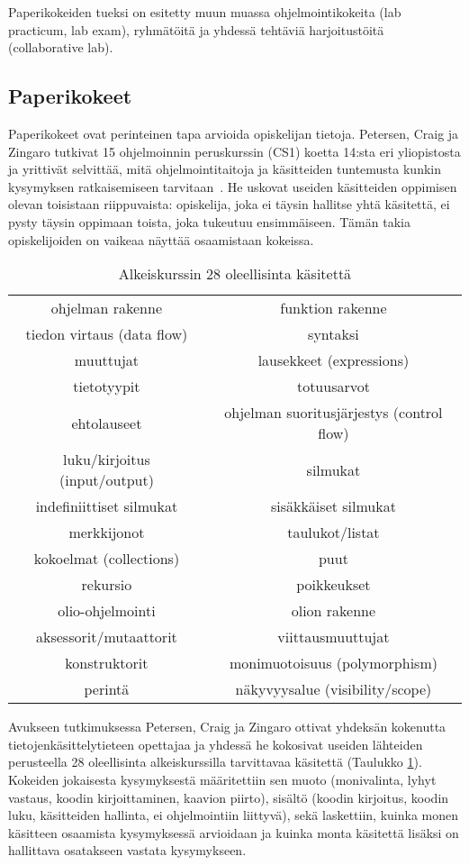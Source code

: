 \documentclass[finnish]{../tktltiki2}
\theoremstyle{definition}
\theoremstyle{remark}
\begin{document}
Paperikokeiden tueksi on esitetty muun muassa ohjelmointikokeita (lab practicum, lab exam), ryhmätöitä ja yhdessä tehtäviä harjoitustöitä (collaborative lab).

\subsection{Paperikokeet}

Paperikokeet ovat perinteinen tapa arvioida opiskelijan tietoja. Petersen, Craig ja Zingaro tutkivat 15 ohjelmoinnin peruskurssin (CS1) koetta 14:sta eri yliopistosta ja yrittivät selvittää, mitä ohjelmointitaitoja ja käsitteiden tuntemusta kunkin kysymyksen ratkaisemiseen tarvitaan~\cite{PCZ11}. He uskovat useiden käsitteiden oppimisen olevan toisistaan riippuvaista: opiskelija, joka ei täysin hallitse yhtä käsitettä, ei pysty täysin oppimaan toista, joka tukeutuu ensimmäiseen. Tämän takia opiskelijoiden on vaikeaa näyttää osaamistaan kokeissa.

\begin{table}
  \begin{tabular}{ c c }
    ohjelman rakenne & funktion rakenne \\
	tiedon virtaus (data flow) & syntaksi \\
    muuttujat & lausekkeet (expressions) \\
    tietotyypit & totuusarvot \\
	ehtolauseet & ohjelman suoritusjärjestys (control flow) \\
    luku/kirjoitus (input/output) & silmukat \\
    indefiniittiset silmukat & sisäkkäiset silmukat \\
	merkkijonot & taulukot/listat \\
    kokoelmat (collections) & puut \\
    rekursio & poikkeukset \\
	olio-ohjelmointi & olion rakenne \\
    aksessorit/mutaattorit & viittausmuuttujat \\
    konstruktorit & monimuotoisuus (polymorphism) \\
    perintä & näkyvyysalue (visibility/scope) \\
  \end{tabular}
\caption{Alkeiskurssin 28 oleellisinta käsitettä}
\label{tab:kasitteet}
\end{table}

Avukseen tutkimuksessa Petersen, Craig ja Zingaro ottivat yhdeksän kokenutta tietojenkäsittelytieteen opettajaa ja yhdessä he kokosivat useiden lähteiden perusteella 28 oleellisinta alkeiskurssilla tarvittavaa käsitettä (Taulukko \ref{tab:kasitteet}). Kokeiden jokaisesta kysymyksestä määritettiin sen muoto (monivalinta, lyhyt vastaus, koodin kirjoittaminen, kaavion piirto), sisältö (koodin kirjoitus, koodin luku, käsitteiden hallinta, ei ohjelmointiin liittyvä), sekä laskettiin, kuinka monen käsitteen osaamista kysymyksessä arvioidaan ja kuinka monta käsitettä lisäksi on hallittava osatakseen vastata kysymykseen.
\end{document}
